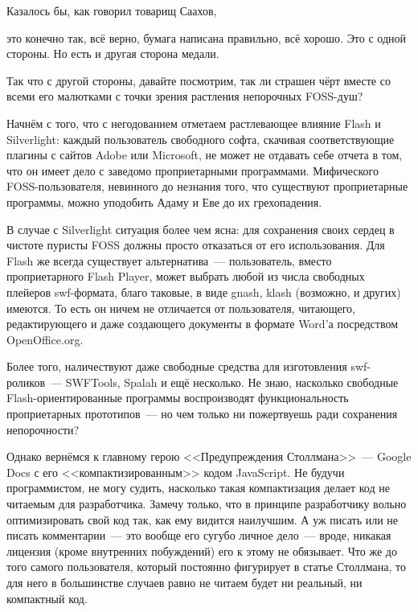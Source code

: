 Казалось бы, как говорил товарищ Саахов,


\begin{shadequote}{} это конечно так, всё верно, бумага написана правильно, всё хорошо. Это с одной стороны. Но есть и другая сторона медали.\end{shadequote}

Так что с другой стороны, давайте посмотрим, так ли страшен чёрт вместе со всеми его малютками с точки зрения растления непорочных FOSS-душ?

Начнём с того, что с негодованием отметаем растлевающее влияние Flash и Silverlight: каждый пользователь свободного софта, скачивая соответствующие плагины с сайтов Adobe или Microsoft, не может не отдавать себе отчета в том, что он имеет дело с заведомо проприетарными программами. Мифического FOSS-пользователя, невинного до незнания того, что существуют проприетарные программы, можно уподобить Адаму и Еве до их грехопадения.

В случае с Silverlight ситуация более чем ясна: для сохранения своих сердец в чистоте пуристы FOSS должны просто отказаться от его использования. Для Flash же всегда существует альтернатива~--- пользователь, вместо проприетарного Flash Player, может выбрать любой из числа свободных плейеров swf-формата, благо таковые, в виде gnash, klash (возможно, и других) имеются. То есть он ничем не отличается от пользователя, читающего, редактирующего и даже создающего документы в формате Word'а посредством OpenOffice.org.

Более того, наличествуют даже свободные средства для изготовления swf-роликов~--- SWFTools, Spalah и ещё несколько. Не знаю, насколько свободные Flash-ориентированные программы воспроизводят функциональность проприетарных прототипов~--- но чем только ни пожертвуешь ради сохранения непорочности?

Однако вернёмся к главному герою <<Предупреждения Столлмана>>~--- Google Docs с его <<компактизированным>> кодом JavaScript. Не будучи программистом, не могу судить, насколько такая компактизация делает код не читаемым для разработчика. Замечу только, что в принципе разработчику вольно оптимизировать свой код так, как ему видится наилучшим. А уж писать или не писать комментарии~--- это вообще его сугубо личное дело~--- вроде, никакая лицензия (кроме внутренних побуждений) его к этому не обязывает. Что же до того самого пользователя, который постоянно фигурирует в статье Столлмана, то для него в большинстве случаев равно не читаем будет ни реальный, ни компактный код.

